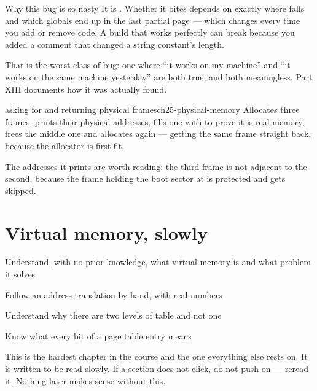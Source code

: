 \begin{warn}{Why this bug is so nasty}
It is . Whether it bites depends on exactly where  falls and
which globals end up in the last partial page --- which changes every time you add or remove code.
A build that works perfectly can break because you added a comment that changed a string constant's
length.

That is the worst class of bug: one where ``it works on my machine'' and ``it works on the same
machine yesterday'' are both true, and both meaningless. Part XIII documents how it was actually
found.
\end{warn}

\begin{recipe}{asking for and returning physical frames}{ch25-physical-memory}
Allocates three frames, prints their physical addresses, fills one with  to prove it is
real memory, frees the middle one and allocates again --- getting the same frame straight back,
because the allocator is first fit.

The addresses it prints are worth reading: the third frame is not adjacent to the second, because
the frame holding the boot sector at  is protected and gets skipped.
\end{recipe}



\chapter{Virtual memory, slowly}

\begin{goals}
  \item Understand, with no prior knowledge, what virtual memory is and what problem it solves
  \item Follow an address translation by hand, with real numbers
  \item Understand why there are two levels of table and not one
  \item Know what every bit of a page table entry means
\end{goals}

This is the hardest chapter in the course and the one everything else rests on. It is written to be
read slowly. If a section does not click, do not push on --- reread it. Nothing later makes sense
without this.

